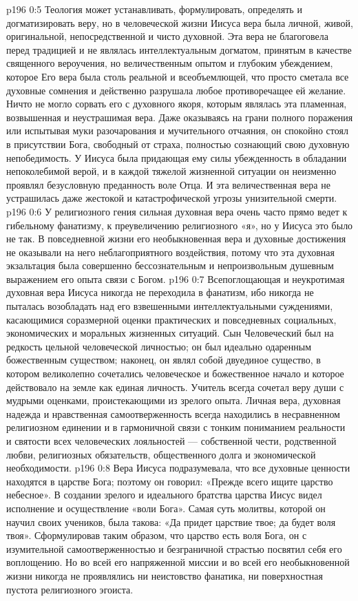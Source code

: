 \vs p196 0:5 Теология может устанавливать, формулировать, определять и догматизировать веру, но в человеческой жизни Иисуса вера была личной, живой, оригинальной, непосредственной и чисто духовной. Эта вера не благоговела перед традицией и не являлась интеллектуальным догматом, принятым в качестве священного вероучения, но величественным опытом и глубоким убеждением, которое  Его вера была столь реальной и всеобъемлющей, что просто сметала все духовные сомнения и действенно разрушала любое противоречащее ей желание. Ничто не могло сорвать его с духовного якоря, которым являлась эта пламенная, возвышенная и неустрашимая вера. Даже оказываясь на грани полного поражения или испытывая муки разочарования и мучительного отчаяния, он спокойно стоял в присутствии Бога, свободный от страха, полностью сознающий свою духовную непобедимость. У Иисуса была придающая ему силы убежденность в обладании непоколебимой верой, и в каждой тяжелой жизненной ситуации он неизменно проявлял безусловную преданность воле Отца. И эта величественная вера не устрашилась даже жестокой и катастрофической угрозы унизительной смерти.
\vs p196 0:6 У религиозного гения сильная духовная вера очень часто прямо ведет к гибельному фанатизму, к преувеличению религиозного «я», но у Иисуса это было не так. В повседневной жизни его необыкновенная вера и духовные достижения не оказывали на него неблагоприятного воздействия, потому что эта духовная экзальтация была совершенно бессознательным и непроизвольным душевным выражением его опыта связи с Богом.
\vs p196 0:7 Всепоглощающая и неукротимая духовная вера Иисуса никогда не переходила в фанатизм, ибо никогда не пыталась возобладать над его взвешенными интеллектуальными суждениями, касающимися соразмерной оценки практических и повседневных социальных, экономических и моральных жизненных ситуаций. Сын Человеческий был на редкость цельной человеческой личностью; он был идеально одаренным божественным существом; наконец, он являл собой двуединое существо, в котором великолепно сочетались человеческое и божественное начало и которое действовало на земле как единая личность. Учитель всегда сочетал веру души с мудрыми оценками, проистекающими из зрелого опыта. Личная вера, духовная надежда и нравственная самоотверженность всегда находились в несравненном религиозном единении и в гармоничной связи с тонким пониманием реальности и святости всех человеческих лояльностей --- собственной чести, родственной любви, религиозных обязательств, общественного долга и экономической необходимости.
\vs p196 0:8 Вера Иисуса подразумевала, что все духовные ценности находятся в царстве Бога; поэтому он говорил: «Прежде всего ищите царство небесное». В создании зрелого и идеального братства царства Иисус видел исполнение и осуществление «воли Бога». Самая суть молитвы, которой он научил своих учеников, была такова: «Да придет царствие твое; да будет воля твоя». Сформулировав таким образом, что царство есть воля Бога, он с изумительной самоотверженностью и безграничной страстью посвятил себя его воплощению. Но во всей его напряженной миссии и во всей его необыкновенной жизни никогда не проявлялись ни неистовство фанатика, ни поверхностная пустота религиозного эгоиста.
